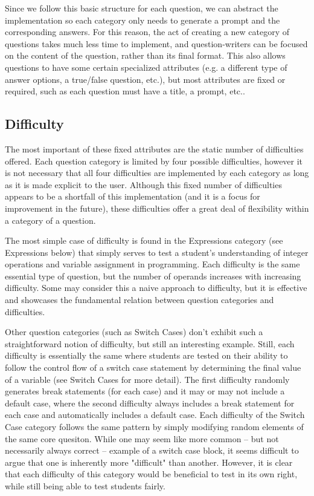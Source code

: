 \documentclass{article}
\begin{document}
Since we follow this basic structure for each question, we can abstract the implementation so each category
only needs to generate a prompt and the corresponding answers. For this reason, the act of creating a new
category of questions takes much less time to implement, and question-writers can be focused on the content of
the question, rather than its final format. This also allows questions to have some certain specialized attributes
(e.g. a different type of answer options, a true/false question, etc.), but most attributes are fixed or required, such as each question
must have a title, a prompt, etc..

\subsection{Difficulty}

The most important of these fixed attributes are the static number of difficulties offered. Each question category is
limited by four possible difficulties, however it is not necessary that all four difficulties are implemented by each category
as long as it is made explicit to the user. Although this fixed number of difficulties appears to be a shortfall of this
implementation (and it is a focus for improvement in the future), these difficulties offer a great deal of flexibility
within a category of a question.

The most simple case of difficulty is found in the Expressions category (see Expressions below)
that simply serves to test a student's understanding of integer operations and variable assignment in programming.
Each difficulty is the same essential type of question, but the number of operands increases with increasing difficulty.
Some may consider this a naive approach to difficulty, but it is effective and showcases the fundamental relation
between question categories and difficulties.

Other question categories (such as Switch Cases) don't exhibit such a straightforward
notion of difficulty, but still an interesting example. Still, each difficulty is essentially the same where students are tested on their
ability to follow the control flow of a switch case statement by determining the final value of a variable (see Switch Cases for more detail).
The first difficulty randomly generates break statements (for each case) and it may or may not include a default case, where the second difficulty
always includes a break statement for each case and automatically includes a default case. Each difficulty of the Switch Case category follows the
same pattern by simply modifying random elements of the same core quesiton. While one may seem like more common -- but not necessarily always
correct -- example of a switch case block, it seems difficult to argue that one is inherently more "difficult" than another. However, it is clear
that each difficulty of this category would be beneficial to test in its own right, while still being able to test students fairly.
\end{document}
